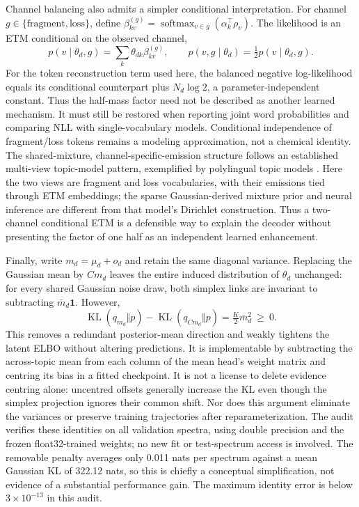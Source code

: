 \documentclass[10pt,a4paper]{article}
\begin{document}
Channel balancing also admits a simpler conditional interpretation. For channel
$g\in\{\mathrm{fragment},\mathrm{loss}\}$, define
$\beta^{(g)}_{kv}=\operatorname{softmax}_{v\in g}(\alpha_k^\top\rho_v)$.
The likelihood is an ETM conditional on the observed channel,
\begin{equation}
 p(v\mid\theta_d,g)=\sum_k\theta_{dk}\beta^{(g)}_{kv},\qquad
 p(v,g\mid\theta_d)=\tfrac12 p(v\mid\theta_d,g).
\end{equation}
For the token reconstruction term used here, the balanced negative
log-likelihood equals its conditional counterpart plus $N_d\log 2$, a
parameter-independent constant. Thus the
half-mass factor need not be described as another learned mechanism. It must
still be restored when reporting joint word probabilities and comparing NLL
with single-vocabulary models. Conditional independence of fragment/loss tokens
remains a modeling approximation, not a chemical identity.
The shared-mixture, channel-specific-emission structure follows an established
multi-view topic-model pattern, exemplified by polylingual topic models
\cite{mimno2009}. Here the two views are fragment and loss vocabularies, with
their emissions tied through ETM embeddings; the sparse Gaussian-derived
mixture prior and neural inference are different from that model's Dirichlet
construction. Thus a two-channel conditional ETM is a defensible way to
explain the decoder without presenting the factor of one half as an
independent learned enhancement.

Finally, write $m_d=\mu_d+o_d$ and retain the same diagonal variance. Replacing
the Gaussian mean by $Cm_d$ leaves the entire induced distribution of
$\theta_d$ unchanged: for every shared Gaussian noise draw, both simplex links
are invariant to subtracting $\bar m_d\mathbf{1}$. However,
\begin{equation}
 \operatorname{KL}(q_{m_d}\Vert p)
 -\operatorname{KL}(q_{Cm_d}\Vert p)
 =\tfrac{K}{2}\bar m_d^2\ \geq\ 0.
 \label{eq:common-mode-reduction}
\end{equation}
This removes a redundant posterior-mean direction and weakly tightens the
latent ELBO without altering predictions. It is implementable by subtracting
the across-topic mean from each column of the mean head's weight matrix and
centring its bias in a fitted checkpoint. It is not a license
to delete evidence centring alone: uncentred offsets generally increase the
KL even though the simplex projection ignores their common shift. Nor does
this argument eliminate the variances or preserve training trajectories after
reparameterization. The audit verifies these identities on all validation
spectra, using double precision and the frozen float32-trained weights; no
new fit or test-spectrum access is involved.
The removable penalty averages only 0.011 nats per spectrum against a mean
Gaussian KL of 322.12 nats, so this is chiefly a conceptual simplification,
not evidence of a substantial performance gain. The maximum identity error
is below $3\times10^{-13}$ in this audit.
\end{document}
